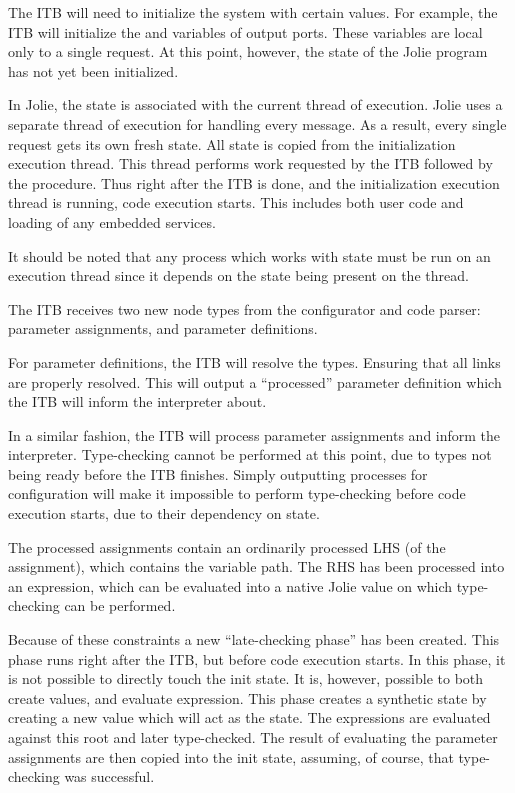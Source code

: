
The ITB will need to initialize the system with certain values. For example,
the ITB will initialize the  and  variables
of output ports. These variables are local only to a single request. At this
point, however, the state of the Jolie program has not yet been initialized.

In Jolie, the state is associated with the current thread of execution. Jolie
uses a separate thread of execution for handling every message. As a result,
every single request gets its own fresh state. All state is copied from the
initialization execution thread. This thread performs work requested by the ITB
followed by the  procedure. Thus right after the ITB is done, and
the initialization execution thread is running, code execution starts. This
includes both user code and loading of any embedded services.

It should be noted that any process which works with state must be run on an
execution thread since it depends on the state being present on the thread.


The ITB receives two new node types from the configurator and code parser:
parameter assignments, and parameter definitions.

For parameter definitions, the ITB will resolve the types. Ensuring that all
links are properly resolved. This will output a ``processed'' parameter
definition which the ITB will inform the interpreter about.

In a similar fashion, the ITB will process parameter assignments and inform the
interpreter. Type-checking cannot be performed at this point, due to types not
being ready before the ITB finishes. Simply outputting processes for
configuration will make it impossible to perform type-checking before code
execution starts, due to their dependency on state.

The processed assignments contain an ordinarily processed LHS (of the
        assignment), which contains the variable path. The RHS has been
processed into an expression, which can be evaluated into a native Jolie value
on which type-checking can be performed.


Because of these constraints a new ``late-checking phase'' has been created.
This phase runs right after the ITB, but before code execution starts. In this
phase, it is not possible to directly touch the init state. It is, however,
    possible to both create values, and evaluate expression. This phase creates
    a synthetic state by creating a new value which will act as the state.  The
    expressions are evaluated against this root and later type-checked. The
    result of evaluating the parameter assignments are then copied into the
    init state, assuming, of course, that type-checking was successful.

